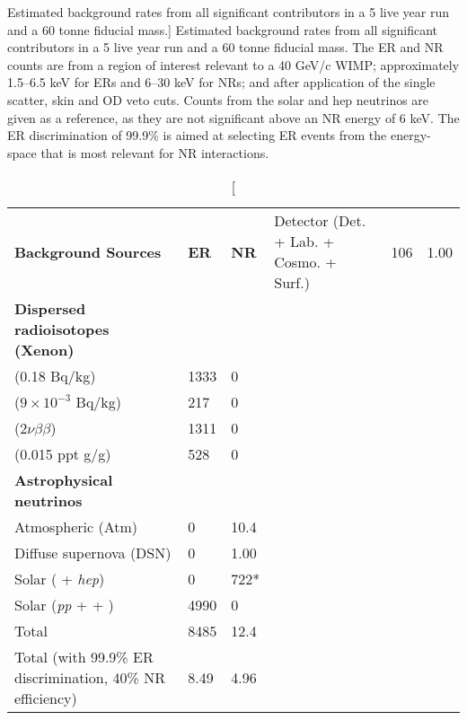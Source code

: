 \begin{table}[]
\centering
\caption
[Estimated background rates from all significant contributors in a 5 live year run and a 60 tonne fiducial mass.]
{Estimated background rates from all significant contributors in a 5 live year run and a 60 tonne fiducial mass. The ER and NR counts are from a region of interest relevant to a 40 GeV/c\squared{} WIMP; approximately 1.5--6.5 keV for ERs and 6--30 keV for NRs; and after application of the single scatter, skin and OD veto cuts. Counts from the solar \BE{} and hep neutrinos are given as a reference, as they are not significant above an NR energy of 6 keV. The ER discrimination of 99.9\% is aimed at selecting ER events from the energy-space that is most relevant for NR interactions.}
\label{tab:g3_background_count}
\vspace{1mm}
\renewcommand{\arraystretch}{1.2}
    \begin{tabularx}{1.0\linewidth}{@{\extracolsep{\fill}}lll}
    \toprule
    \textbf{Background Sources} & %
    \textbf{ER} & %
    \textbf{NR} & %
    \hline
    \hline

    Detector (Det. + Lab. + Cosmo. + Surf.)     & 106  & 1.00 \\
    \textbf{Dispersed radioisotopes (Xenon)}    &      &      \\
    \RnTTT{} (0.18 \micro{}Bq/kg)                & 1333 & 0    \\
    \RnTTZ{} ($9\times10^{-3}$ \micro{}Bq/kg)               & 217  & 0    \\
    \XeOTS{} ($2\nu\beta\beta$)                 & 1311 & 0    \\
    \KrEF{} (0.015 ppt g/g)                     & 528  & 0    \\
    \textbf{Astrophysical neutrinos}            &      &      \\
    Atmospheric (Atm)                           & 0    & 10.4 \\
    Diffuse supernova (DSN)                     & 0    & 1.00 \\
    Solar (\BE{} + \textit{hep})                & 0    & 722* \\
    Solar (\textit{pp} + \BeS{} + \NOT{})       & 4990 & 0    \\
    \hline
    Total                                                       & 8485 & 12.4 \\
    Total (with 99.9\% ER discrimination, 40\% NR efficiency)   & 8.49 & 4.96 \\
    
    \bottomrule
    \end{tabularx}
\end{table}